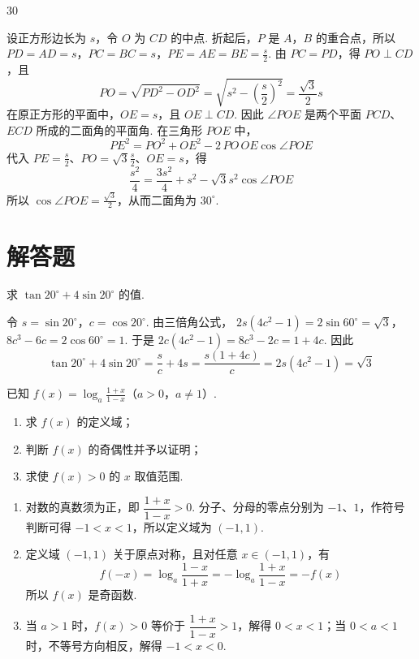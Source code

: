\documentclass[UTF8,a4paper,oneside,11pt]{ctexbook}
\begin{document}
\begin{answer}
30
\end{answer}

\begin{solution}
设正方形边长为 \(s\)，令 \(O\) 为 \(CD\) 的中点. 折起后，\(P\) 是 \(A\)，\(B\) 的重合点，所以
\(PD=AD=s\)，\(PC=BC=s\)，\(PE=AE=BE=\frac s2\).
由 \(PC=PD\)，得 \(PO\perp CD\)，且
\[
PO=\sqrt{PD^2-OD^2}=\sqrt{s^2-\left(\frac s2\right)^2}=\frac{\sqrt3}{2}s
\]
在原正方形的平面中，\(OE=s\)，且 \(OE\perp CD\). 因此 \(\angle POE\) 是两个平面 \(PCD\)、\(ECD\) 所成的二面角的平面角. 在三角形 \(POE\) 中，
\[
PE^2=PO^2+OE^2-2\,PO\,OE\cos\angle POE
\]
代入 \(PE=\frac{s}{2}\)、\(PO=\sqrt3\frac{s}{2}\)、\(OE=s\)，得
\[
\frac{s^2}{4}=\frac{3s^2}{4}+s^2-\sqrt3s^2\cos\angle POE
\]
所以 \(\cos\angle POE=\frac{\sqrt3}{2}\)，从而二面角为 \(30^\circ\).
\end{solution}

\section{解答题}

\begin{problem}
求 \(\tan 20^{\circ}+4\sin 20^{\circ}\) 的值.
\end{problem}

\begin{solution}
令 \(s=\sin20^\circ\)，\(c=\cos20^\circ\). 由三倍角公式，
\(2s(4c^2-1)=2\sin60^\circ=\sqrt3\)，\(8c^3-6c=2\cos60^\circ=1\).
于是 \(2c(4c^2-1)=8c^3-2c=1+4c\). 因此
\[
\tan20^\circ+4\sin20^\circ
=\frac{s}{c}+4s
=\frac{s(1+4c)}{c}
=2s(4c^2-1)=\sqrt3
\]
\end{solution}

\begin{problem}
已知 \(f(x)=\log_a \frac{1+x}{1-x}\)（\(a>0\)，\(a\neq 1\)）.

\begin{enumerate}
\item 求 \(f(x)\) 的定义域；
\item 判断 \(f(x)\) 的奇偶性并予以证明；
\item 求使 \(f(x)>0\) 的 \(x\) 取值范围.
\end{enumerate}
\end{problem}

\begin{solution}
\begin{enumerate}
\item 对数的真数须为正，即 \(\dfrac{1+x}{1-x}>0\). 分子、分母的零点分别为 \(-1\)、\(1\)，作符号判断可得 \(-1<x<1\)，所以定义域为 \((-1,1)\).
\item 定义域 \((-1,1)\) 关于原点对称，且对任意 \(x\in(-1,1)\)，有
\[
f(-x)=\log_a\frac{1-x}{1+x}=-\log_a\frac{1+x}{1-x}=-f(x)
\]
所以 \(f(x)\) 是奇函数.
\item 当 \(a>1\) 时，\(f(x)>0\) 等价于 \(\dfrac{1+x}{1-x}>1\)，解得 \(0<x<1\)；当 \(0<a<1\) 时，不等号方向相反，解得 \(-1<x<0\).
\end{enumerate}
\end{solution}
\end{document}
